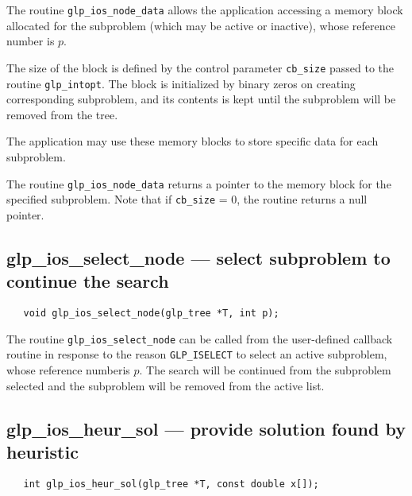 \description

The routine \verb|glp_ios_node_data| allows the application accessing
a memory block allocated for the subproblem (which may be active or
inactive), whose reference number is $p$.

The size of the block is defined by the control parameter
\verb|cb_size| passed to the routine \verb|glp_intopt|. The block is
initialized by binary zeros on creating corresponding subproblem, and
its contents is kept until the subproblem will be removed from the
tree.

The application may use these memory blocks to store specific data for
each subproblem.

\returns

The routine \verb|glp_ios_node_data| returns a pointer to the memory
block for the specified subproblem. Note that if \verb|cb_size| = 0,
the routine returns a null pointer.

\subsection{glp\_ios\_select\_node --- select subproblem to continue
the search}

\synopsis

\begin{verbatim}
   void glp_ios_select_node(glp_tree *T, int p);
\end{verbatim}

\description

The routine \verb|glp_ios_select_node| can be called from the
user-defined callback routine in response to the reason
\verb|GLP_ISELECT| to select an active subproblem, whose reference
number\linebreak is $p$. The search will be continued from the
subproblem selected and the subproblem will be removed from the active
list.

\newpage

\subsection{glp\_ios\_heur\_sol --- provide solution found by
heuristic}

\synopsis

\begin{verbatim}
   int glp_ios_heur_sol(glp_tree *T, const double x[]);
\end{verbatim}

\description

